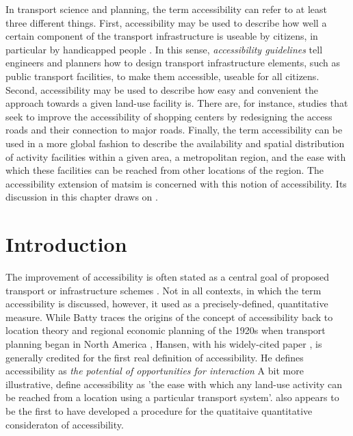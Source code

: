 In transport science and planning, the term accessibility can refer to at least three different things. 
First, accessibility may be used to describe how well a certain component of the transport infrastructure 
is useable by citizens, in particular by handicapped people \citep{Faura2012AccessibilityEvaluationTrafficSimulation}. 
In this sense, \textit{accessibility guidelines} tell engineers and planners how to design transport 
infrastructure elements, such as public transport facilities, to make them accessible, \ie useable 
for all citizens. Second, accessibility may be used to describe how easy and convenient the approach 
towards a given land-use facility is. There are, for instance, studies \citep{Fujiyama2004AccessibleDesignPTFacilities} 
that seek to improve the accessibility of shopping centers by redesigning the access roads and their 
connection to major roads. Finally, the term accessibility can be used in a more global fashion to 
describe the availability and spatial distribution of activity facilities within a given area, \eg a 
metropolitan region, and the ease with which these facilities can be reached from other locations of 
the region. The accessibility extension of \gls{matsim} is concerned with this notion of accessibility. 
Its discussion in this chapter draws on \citet{NicolaiNagel2012HiResAccessibilityMethodInBook}.



\section{Introduction}
The improvement of accessibility is often stated as a central goal of proposed transport or infrastructure 
schemes \citep{GeursEtAl2012AccessibilityTransportIntroduction}. Not in all contexts, in which the term 
accessibility is discussed, however, it used as a precisely-defined, quantitative measure. While Batty 
\citep{Batty2009} traces the origins of the concept of accessibility back to location theory and regional 
economic planning of the 1920s when transport planning began in North America \citep{GeursEtAl2012AccessibilityTransportIntroduction}, 
Hansen, with his widely-cited paper \citep{Hansen1959}, is generally credited for the first real 
definition of accessibility. He defines accessibility as \textit{the potential of opportunities for interaction} 
A bit more illustrative, \citet{DalviMartin1976...} define accessibility as 'the ease with which any 
land-use activity can be reached from a location using a particular transport system'. \citet{Hansen1959} 
also appears to be the first to have developed a procedure for the quatitaive quantitative consideraton of 
accessibility.

